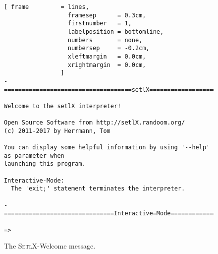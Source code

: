 \begin{figure}[!ht]
\centering
\begin{Verbatim}[ frame         = lines, 
                  framesep      = 0.3cm, 
                  firstnumber   = 1,
                  labelposition = bottomline,
                  numbers       = none,
                  numbersep     = -0.2cm,
                  xleftmargin   = 0.0cm,
                  xrightmargin  = 0.0cm,
                ]
-====================================setlX=============================v2.7.0=-

Welcome to the setlX interpreter!

Open Source Software from http://setlX.randoom.org/
(c) 2011-2017 by Herrmann, Tom

You can display some helpful information by using '--help' as parameter when
launching this program.

Interactive-Mode:
  The 'exit;' statement terminates the interpreter.

-===============================Interactive=Mode==============================-

=> 
\end{Verbatim}
\vspace*{-0.3cm}
\caption{The \textsc{SetlX}-Welcome message.}
\label{fig:setlx}
\end{figure}

